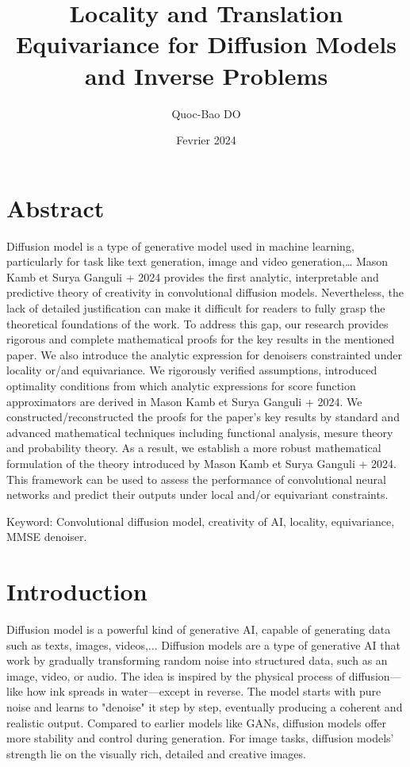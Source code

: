 \documentclass[a4paper,10pt]{article}
\title{Locality and Translation Equivariance for Diffusion Models and Inverse Problems}
\author{Quoc-Bao DO}
\date{Fevrier 2024}
\theoremstyle{definition} %
\theoremstyle{definition} %
\theoremstyle{definition} %
\theoremstyle{definition} %
\begin{document}
\maketitle


\newpage
\tableofcontents
\newpage

\section*{Abstract}
Diffusion model is a type of generative model used in machine learning, particularly for task like text generation, image and video generation,… Mason Kamb et Surya Ganguli + 2024 provides the first analytic, interpretable and predictive theory of creativity in convolutional diffusion models. Nevertheless, the lack of detailed justification can make it difficult for readers to fully grasp the theoretical foundations of the work. To address this gap, our research provides rigorous and complete mathematical proofs for the key results in the mentioned paper. We also introduce the analytic expression for denoisers constrainted under locality or/and equivariance. We rigorously verified assumptions, introduced optimality conditions from which analytic expressions for score function approximators are derived in Mason Kamb et Surya Ganguli + 2024. We constructed/reconstructed the proofs for the paper’s key results by standard and advanced mathematical techniques including functional analysis, mesure theory and probability theory. As a result, we establish a more robust mathematical formulation of the theory introduced by Mason Kamb et Surya Ganguli + 2024. This framework can be used to assess the performance of convolutional neural networks and predict their outputs under local and/or equivariant constraints.

Keyword: Convolutional diffusion model, creativity of AI, locality, equivariance, MMSE denoiser.

\section{Introduction}
Diffusion model is a powerful kind of generative AI, capable of generating data such as texts, images, videos,... Diffusion models are a type of generative AI that work by gradually transforming random noise into structured data, such as an image, video, or audio. The idea is inspired by the physical process of diffusion—like how ink spreads in water—except in reverse. The model starts with pure noise and learns to "denoise" it step by step, eventually producing a coherent and realistic output. Compared to earlier models like GANs, diffusion models offer more stability and control during generation.  For image tasks, diffusion models’ strength lie on the visually rich, detailed and creative images. 
\end{document}

